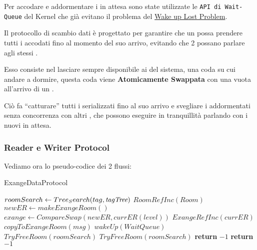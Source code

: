 Per accodare e addormentare i \Reader in attesa sono state utilizzate le  \texttt{API di Wait-Queue} del Kernel che già
evitano il problema del \underline{Wake up Lost Problem}.

Il protocollo di scambio dati è progettato per garantire che un \Writer possa prendere tutti i \Reader accodati fino al
momento del suo arrivo, evitando che 2 \Writer possano parlare agli stessi \Reader.

Esso consiste nel lasciare sempre disponibile ai \Reader del sistema, una coda su cui andare a dormire, questa coda
viene \textbf{Atomicamente Swappata}  con una vuota all'arrivo di un \Writer.

Ciò fa ``catturare'' tutti i \Reader serializzati fino al suo arrivo e svegliare i \Reader addormentati senza
concorrenza con altri \Writer, che possono eseguire in tranquillità parlando con i nuovi \Reader in attesa.

\Writer

\subsubsection{Reader e Writer Protocol}
Vediamo ora lo pseudo-codice dei 2 flussi:

\begin{algorithm}
\caption{\Writer ExangeDataProtocol}\label{writeExange}
\begin{algorithmic}[1]
\State $roomSearch \gets Tree_Search(tag, \textit{tagTree})$
    \State $RoomRefInc(Room)$
        \State $newER \gets makeExangeRoom()$
        \State $exange \gets CompareSwap(newER, currER(level))$
        \State $ExangeRefInc(currER)$
        \State $copyToExangeRoom(msg)$
        \State $wakeUp(WaitQueue)$
        \State $TryFreeRoom(roomSearch)$
    \Else
        \State $TryFreeRoom(roomSearch)$
        \State \textbf{return} $-1$
    \EndIf
\Else
    \State \textbf{return} $-1$

\EndIf
\EndProcedure
\end{algorithmic}
\end{algorithm}


